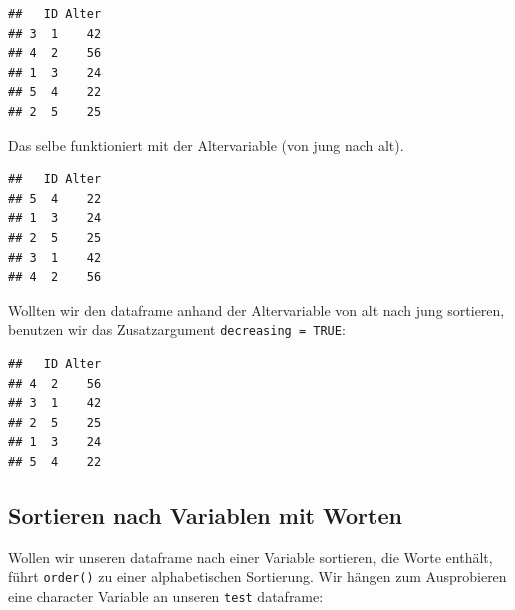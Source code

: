 \documentclass[
]{book}
\newenvironment{Shaded}{\begin{snugshade}}{\end{snugshade}}
\newcommand{\AttributeTok}[1]{\textcolor[rgb]{0.77,0.63,0.00}{#1}}
\newcommand{\CommentTok}[1]{\textcolor[rgb]{0.56,0.35,0.01}{\textit{#1}}}
\newcommand{\ConstantTok}[1]{\textcolor[rgb]{0.00,0.00,0.00}{#1}}
\newcommand{\FunctionTok}[1]{\textcolor[rgb]{0.00,0.00,0.00}{#1}}
\newcommand{\NormalTok}[1]{#1}
\newcommand{\OtherTok}[1]{\textcolor[rgb]{0.56,0.35,0.01}{#1}}
\newcommand{\SpecialCharTok}[1]{\textcolor[rgb]{0.00,0.00,0.00}{#1}}
\begin{document}
\begin{verbatim}
##   ID Alter
## 3  1    42
## 4  2    56
## 1  3    24
## 5  4    22
## 2  5    25
\end{verbatim}

Das selbe funktioniert mit der Altervariable (von jung nach alt).

\begin{Shaded}
\end{Shaded}

\begin{verbatim}
##   ID Alter
## 5  4    22
## 1  3    24
## 2  5    25
## 3  1    42
## 4  2    56
\end{verbatim}

Wollten wir den dataframe anhand der Altervariable von alt nach jung sortieren, benutzen wir das Zusatzargument \texttt{decreasing\ =\ TRUE}:

\begin{Shaded}
\end{Shaded}

\begin{verbatim}
##   ID Alter
## 4  2    56
## 3  1    42
## 2  5    25
## 1  3    24
## 5  4    22
\end{verbatim}

\hypertarget{sortieren-nach-variablen-mit-worten}{%
\subsection{Sortieren nach Variablen mit Worten}\label{sortieren-nach-variablen-mit-worten}}

Wollen wir unseren dataframe nach einer Variable sortieren, die Worte enthält, führt \texttt{order()} zu einer alphabetischen Sortierung. Wir hängen zum Ausprobieren eine character Variable an unseren \texttt{test} dataframe:
\end{document}
